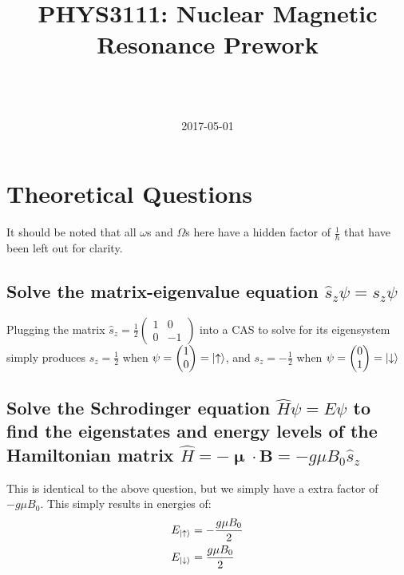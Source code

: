 \documentclass[a4paper]{scrartcl}
\begin{document}
\title{PHYS3111: Nuclear Magnetic Resonance Prework}
\author{ \\ \\}
\date{2017-05-01}
\maketitle

\section{Theoretical Questions}
It should be noted that all \(\omega\)s and \(\Omega\)s here have a hidden factor of \(\frac{1}{\hbar}\) that have been left out for clarity.

\subsection{Solve the matrix-eigenvalue equation \(\hat{s}_z \psi = s_z \psi\)}
Plugging the matrix \(\hat{s}_z = \frac{1}{2} \begin{pmatrix}1 & 0 \\ 0 & -1\end{pmatrix}\) into a CAS to solve for its eigensystem simply produces \(s_z = \frac{1}{2}\) when \(\psi = \begin{pmatrix}1 \\ 0\end{pmatrix} = \ket{\uparrow}\), and \(s_z = -\frac{1}{2}\) when \(\psi = \begin{pmatrix}0 \\ 1\end{pmatrix} = \ket{\downarrow}\)

\subsection{Solve the Schrodinger equation \(\hat{H} \psi = E \psi\) to find the eigenstates and energy levels of the Hamiltonian matrix \(\hat{H} = -\boldsymbol{\upmu} \cdot \mathbf{B} = -g \mu B_0 \hat{s}_z\)}
This is identical to the above question, but we simply have a extra factor of \(-g \mu B_0\). This simply results in energies of:
\begin{align*}
    E_{\ket{\uparrow}} &= -\frac{g \mu B_0}{2} \\
    E_{\ket{\downarrow}} &= \frac{g \mu B_0}{2}
\end{align*}
\end{document}
